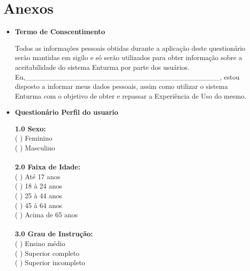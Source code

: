 \chapter*{Anexos}

\begin{itemize}

	\item \textbf{Termo de Conscentimento}

		Todos as informações pessoais obtidas durante a aplicação deste questionário serão mantidas em sigilo e só serão utilizados para obter informação sobre a aceitabilidade do sistema Enturma por parte dos usuários. \\
		Eu,\_\_\_\_\_\_\_\_\_\_\_\_\_\_\_\_\_\_\_\_\_\_\_\_\_\_\_\_\_\_\_\_\_\_\_\_\_\_, estou disposto a informar meus dados pessoais, assim como utilizar o sistema Enturma com o objetivo de obter e repassar a Experiência de Uso do mesmo.



	\item \textbf{Questionário Perfil do usuario}


		\textbf{1.0 Sexo:}
			\\
			  ( ) Feminino \\
			  ( ) Masculino\\
			\\
		\textbf{2.0 Faixa de Idade:}
			\\
			  ( ) Até 17 anos\\
			  ( ) 18 à 24 anos\\
			  ( ) 25 à 44 anos\\
			  ( ) 45 à 64 anos\\
			  ( ) Acima de 65 anos\\
			\\
		\textbf{3.0 Grau de Instrução:}
			\\
			  ( ) Ensino médio\\
			  ( ) Superior completo\\
			  ( ) Superior incompleto\\
			\\


\end{itemize}
